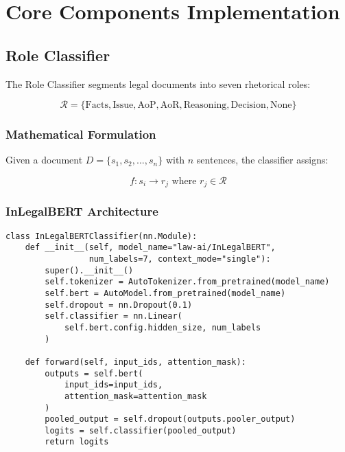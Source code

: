 \documentclass[12pt,a4paper]{article}
\begin{document}
\section{Core Components Implementation}

\subsection{Role Classifier}

The Role Classifier segments legal documents into seven rhetorical roles:

\begin{equation}
    \mathcal{R} = \{\text{Facts}, \text{Issue}, \text{AoP}, \text{AoR}, \text{Reasoning}, \text{Decision}, \text{None}\}
\end{equation}

\subsubsection{Mathematical Formulation}

Given a document $D = \{s_1, s_2, ..., s_n\}$ with $n$ sentences, the classifier assigns:

\begin{equation}
    f: s_i \rightarrow r_j \text{ where } r_j \in \mathcal{R}
\end{equation}

\subsubsection{InLegalBERT Architecture}

\begin{lstlisting}[caption={InLegalBERT Classifier Implementation}]
class InLegalBERTClassifier(nn.Module):
    def __init__(self, model_name="law-ai/InLegalBERT", 
                 num_labels=7, context_mode="single"):
        super().__init__()
        self.tokenizer = AutoTokenizer.from_pretrained(model_name)
        self.bert = AutoModel.from_pretrained(model_name)
        self.dropout = nn.Dropout(0.1)
        self.classifier = nn.Linear(
            self.bert.config.hidden_size, num_labels
        )
    
    def forward(self, input_ids, attention_mask):
        outputs = self.bert(
            input_ids=input_ids,
            attention_mask=attention_mask
        )
        pooled_output = self.dropout(outputs.pooler_output)
        logits = self.classifier(pooled_output)
        return logits
\end{lstlisting}
\end{document}
